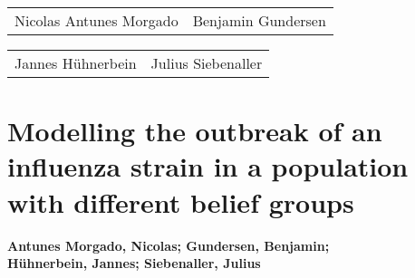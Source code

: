 \documentclass[11pt]{article}
\begin{document}
\begin{center}
\bigskip
\bigskip
\bigskip
\bigskip

\begin{tabular}{@{}p{8cm}@{}@{}p{8cm}@{}}

\begin{minipage}{8cm}
\large Nicolas Antunes Morgado
\end{minipage}

&
\begin{minipage}{8cm}
\large Benjamin Gundersen
\end{minipage}

\end{tabular}


\vspace{3\baselineskip}

\begin{tabular}{@{}p{8cm}@{}@{}p{8cm}@{}}

\begin{minipage}{8cm}
\large Jannes H\"uhnerbein 
\end{minipage}
&
\begin{minipage}{8cm}
\large Julius Siebenaller
\end{minipage}
\end{tabular}

\end{center}


\newpage










\section*{Modelling the outbreak of an influenza strain in a population with different belief groups}
\begin{center}
\textbf{Antunes Morgado, Nicolas; Gundersen, Benjamin; \\H{\"u}hnerbein, Jannes; Siebenaller, Julius}
\end{center}
\end{document}
